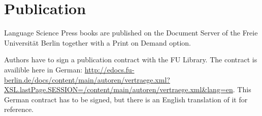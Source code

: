 \chapter{Publication}

Language Science Press books are published on the Document Server of the Freie Universität Berlin
together with a Print on Demand option.

Authors have to sign a publication contract with the FU Library. The contract is availible here in
German:
\url{http://edocs.fu-berlin.de/docs/content/main/autoren/vertraege.xml?XSL.lastPage.SESSION=/content/main/autoren/vertraege.xml&lang=en}. This
German contract has to be signed, but there is an English translation of it for reference.
